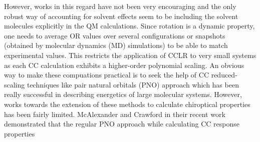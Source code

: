 However, works in this regard have not been very encouraging\cite{silva04,Stephens001,Kongsted05,Mennucci02} 
and the only robust way of accounting for solvent effects seem to be including the solvent molecules explicitly 
in the QM calculations. Since rotation is a dynamic property, one needs to average OR values over several 
configurations or snapshots (obtained by molecular dynamics (MD) simulations) to be able to match experimental 
values. This restricts the application of CCLR to very small systems as each CC calculation exhibits
a higher-order polynomial scaling.
An obvious way to make these compuations practical is to seek the help of CC reduced-scaling 
techniques like pair natural orbitals (PNO) approach\cite{Neese09,NeeseCCSD09} which has been really successful in describing energetics of 
large molecular systems. However, works towards the extension of these methods to calculate chiroptical properties has been 
fairly limited\cite{Gauss00,Korona04,Russ04,McAlexander12,Friedrich15,Russ08}. McAlexander and Crawford in their recent 
work\cite{McAlexander15:LRCC} demonstrated that the regular PNO approach while calculating CC response properties 
